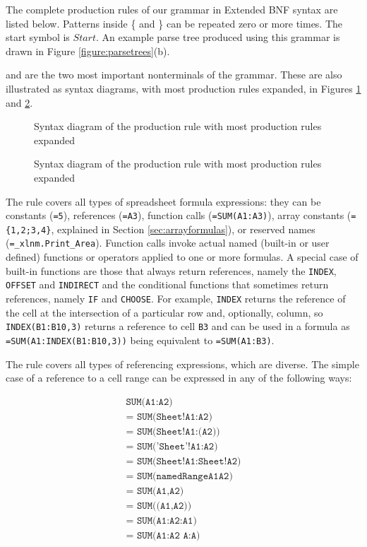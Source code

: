 \documentclass[times]{smrauth}
\begin{document}
The complete production rules of our grammar in Extended BNF syntax are listed below.
Patterns inside \{ and \} can be repeated zero or more times.
The start symbol is $Start$. An example parse tree produced using this grammar is drawn in Figure \ref{figure:parsetrees}(b).



 and  are the two most important nonterminals of the grammar.
These are also illustrated as syntax diagrams, with most production rules expanded, in Figures \ref{figure:Formula} and \ref{figure:Reference}.

\begin{figure}[]
	
	\caption{Syntax diagram of the  production rule with most production rules expanded}
	\label{figure:Formula}
\end{figure}

\begin{figure}[]
	\centering
	
	\caption{Syntax diagram of the  production rule with most production rules expanded}
	\label{figure:Reference}
\end{figure}

The  rule covers all types of spreadsheet formula expressions: they can be constants (\texttt{=5}), references (\texttt{=A3}), function calls (\texttt{=SUM(A1:A3)}), array constants (\texttt{=\{1,2;3,4\}}, explained in Section \ref{sec:arrayformulas}), or reserved names (\texttt{=_xlnm.Print_Area}). Function calls invoke actual named (built-in or user defined) functions or operators applied to one or more formulas. A special case of built-in functions are those that always return references, namely the \texttt{INDEX}, \texttt{OFFSET} and \texttt{INDIRECT} and the conditional functions that sometimes return references, namely \texttt{IF} and \texttt{CHOOSE}.
For example, \texttt{INDEX} returns the reference of the cell at the intersection of a particular row and, optionally, column, so \texttt{INDEX(B1:B10,3)} returns a reference to cell \texttt{B3} and can be used in a formula as \texttt{=SUM(A1:INDEX(B1:B10,3))} being equivalent to \texttt{=SUM(A1:B3)}.

The  rule covers all types of referencing expressions, which are diverse. The simple case of a reference to a cell range can be expressed in any of the following ways:

\begin{align}
	\texttt{SUM(A1:A2)} \\ 
	\texttt{= SUM(Sheet!A1:A2)} \\
	\texttt{= SUM(Sheet!A1:(A2))} \\
	\texttt{= SUM('Sheet'!A1:A2)} \\
	\texttt{= SUM(Sheet!A1:Sheet!A2)} \\
	\texttt{= SUM(namedRangeA1A2)} \\ 
	\texttt{= SUM(A1,A2)} \\ 
	\texttt{= SUM((A1,A2))} \\ 
	\texttt{= SUM(A1:A2:A1)} \\
	\texttt{= SUM(A1:A2 A:A)} 
\end{align}
\end{document}

